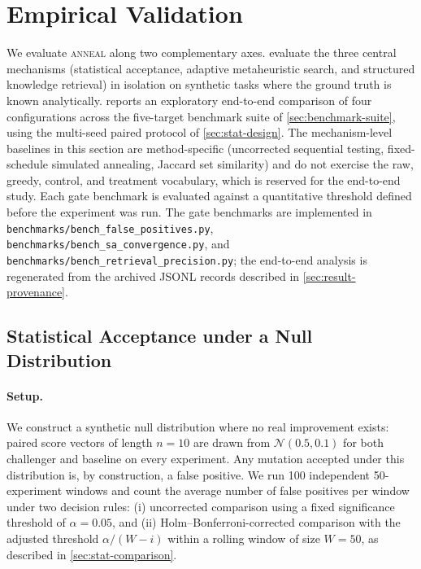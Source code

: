 \section{Empirical Validation}
\label{sec:results}

We evaluate \textsc{anneal} along two complementary axes.
 evaluate the three central mechanisms (statistical acceptance, adaptive metaheuristic search, and structured knowledge retrieval) in isolation on synthetic tasks where the ground truth is known analytically.
 reports an exploratory end-to-end comparison of four configurations across the five-target benchmark suite of \cref{sec:benchmark-suite}, using the multi-seed paired protocol of \cref{sec:stat-design}.
The mechanism-level baselines in this section are method-specific (uncorrected sequential testing, fixed-schedule simulated annealing, Jaccard set similarity) and do not exercise the raw, greedy, control, and treatment vocabulary, which is reserved for the end-to-end study.
Each gate benchmark is evaluated against a quantitative threshold defined before the experiment was run.
The gate benchmarks are implemented in \texttt{benchmarks/\allowbreak{}bench\_\allowbreak{}false\_\allowbreak{}positives.py}, \texttt{benchmarks/\allowbreak{}bench\_\allowbreak{}sa\_\allowbreak{}convergence.py}, and \texttt{benchmarks/\allowbreak{}bench\_\allowbreak{}retrieval\_\allowbreak{}precision.py}; the end-to-end analysis is regenerated from the archived JSONL records described in \cref{sec:result-provenance}.

\subsection{Statistical Acceptance under a Null Distribution}
\label{sec:gate-false-positives}

\paragraph{Setup.}
We construct a synthetic null distribution where no real improvement exists: paired score vectors of length $n = 10$ are drawn from $\mathcal{N}(0.5, 0.1)$ for both challenger and baseline on every experiment.
Any mutation accepted under this distribution is, by construction, a false positive.
We run 100 independent 50-experiment windows and count the average number of false positives per window under two decision rules:
(i) uncorrected comparison using a fixed significance threshold of $\alpha = 0.05$, and
(ii) Holm--Bonferroni-corrected comparison with the adjusted threshold $\alpha / (W - i)$ within a rolling window of size $W = 50$, as described in \cref{sec:stat-comparison}.

